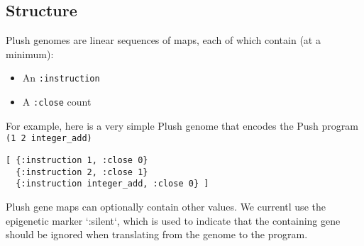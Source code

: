 
\subsection{Structure}
Plush genomes are linear sequences of maps, each of which contain (at a minimum):

\begin{itemize}
  \item An \texttt{:instruction}
  \item A \texttt{:close} count
\end{itemize}

For example, here is a very simple Plush genome that encodes the Push program \texttt{(1 2 integer\_add)}

\begin{verbatim}
[ {:instruction 1, :close 0}
  {:instruction 2, :close 1}
  {:instruction integer_add, :close 0} ]
\end{verbatim}

Plush gene maps can optionally contain other values. We currentl use the
epigenetic marker `:silent`,
which is used to indicate that the containing gene should be ignored when
translating from the genome to the program.

